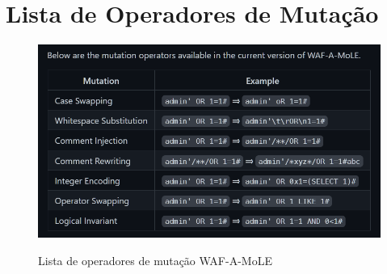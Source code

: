 {\let\clearpage\relax \chapter{\textnormal{Lista de Operadores de Mutação}}}

\begin{figure}[ht]
    \centering
    \caption{Lista de operadores de mutação WAF-A-MoLE}
    \includegraphics[width=16cm]{figuras/mutation_operators_wafamole.png}
    \label{fig:internet} 
\end{figure}